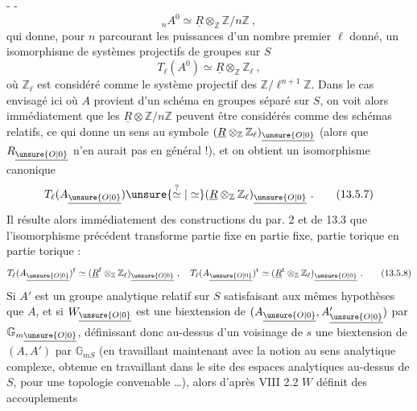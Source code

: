 -  - 
\[
{}_n A^0\simeq\underline R\otimes_{\mathbb Z}\mathbb Z/n\mathbb Z\ ,\tag{13.5.5}
\]
qui donne, pour $n$ parcourant les puissances d'un nombre premier $\ell$ donné, un isomorphisme de systèmes projectifs de groupes sur $S$
\[
T_\ell(A^0)\simeq\underline R\otimes_{\mathbb Z}\mathbb Z_\ell\ ,\tag{13.5.6}
\]
où $\mathbb Z_\ell$ est considéré comme le système projectif des $\mathbb Z/\ell^{n+1}\mathbb Z$. Dans le cas envisagé ici où $A$ provient d'un schéma en groupes séparé sur $S$, on voit alors immédiatement que les $\underline R\otimes\mathbb Z/n\mathbb Z$ peuvent être considérés comme des schémas relatifs, ce qui donne un sens au symbole $(\underline R\otimes_{\mathbb Z}\mathbb Z_\ell)_{\underline{\unsure{O|0}}}$ (alors que $R_{\underline{\unsure{O|0}}}$ n'en aurait pas en général !), et on obtient un isomorphisme canonique
\[
T_\ell(A_{\underline{\unsure{O|0}}})\unsure{\overset{?}{\simeq}|\simeq}(\underline R\otimes_{\mathbb Z}\mathbb Z_\ell)_{\underline{\unsure{O|0}}}\ .\tag{13.5.7}
\]
Il résulte alors immédiatement des constructions du par. 2 et de 13.3 que l'isomorphisme précédent transforme partie fixe en partie fixe, partie torique en partie torique :
\[
T_\ell(A_{\underline{\unsure{O|0}}})^{\mathrm f}\simeq(\underline R^{\mathrm f}\otimes_{\mathbb Z}\mathbb Z_\ell)_{\underline{\unsure{O|0}}}\ ,\quad T_\ell(A_{\underline{\unsure{O|0}}})^{\mathrm t}\simeq(\underline R^{\mathrm t}\otimes_{\mathbb Z}\mathbb Z_\ell)_{\underline{\unsure{O|0}}}\ .\tag{13.5.8}
\]
Si $A'$ est un groupe analytique relatif sur $S$ satisfaisant aux mêmes hypothèses que $A$, et si $W_{\underline{\unsure{O|0}}}$ est une biextension de $(A_{\underline{\unsure{O|0}}},A'_{\underline{\unsure{O|0}}})$ par $\mathbb G_{m\underline{\unsure{O|0}}}$, définissant donc au-dessus d'un voisinage de $s$ une biextension de $(A,A')$ par $\mathbb G_{mS}$ (en travaillant maintenant avec la notion au sens analytique complexe, obtenue en travaillant dans le site des espaces analytiques au-dessus de $S$, pour une topologie convenable \ldots), alors d'après VIII 2.2 $W$ définit des accouplements
